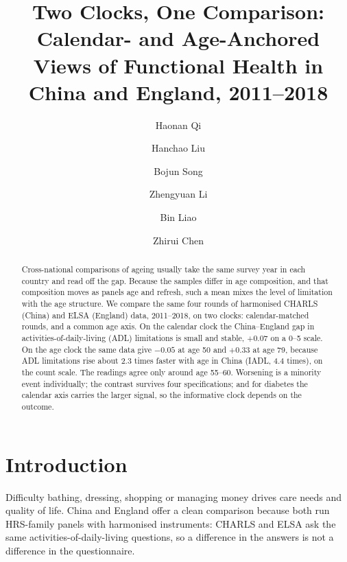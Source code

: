 \documentclass[runningheads]{llncs}
\begin{document}
\title{Two Clocks, One Comparison: Calendar- and Age-Anchored Views of Functional Health in China and England, 2011--2018}

\author{Haonan Qi \and Hanchao Liu \and Bojun Song \and Zhengyuan Li \and Bin Liao \and Zhirui Chen}


\maketitle

\begin{abstract}
Cross-national comparisons of ageing usually take the same survey year in each country and read off the gap. Because the samples differ in age composition, and that composition moves as panels age and refresh, such a mean mixes the level of limitation with the age structure. We compare the same four rounds of harmonised CHARLS (China) and ELSA (England) data, 2011--2018, on two clocks: calendar-matched rounds, and a common age axis. On the calendar clock the China--England gap in activities-of-daily-living (ADL) limitations is small and stable, $+0.07$ on a 0--5 scale. On the age clock the same data give $-0.05$ at age 50 and $+0.33$ at age 79, because ADL limitations rise about 2.3 times faster with age in China (IADL, 4.4 times), on the count scale. The readings agree only around age 55--60. Worsening is a minority event individually; the contrast survives four specifications; and for diabetes the calendar axis carries the larger signal, so the informative clock depends on the outcome.
\end{abstract}

\section{Introduction}

Difficulty bathing, dressing, shopping or managing money drives care needs and quality of life. China and England offer a clean comparison because both run HRS-family panels with harmonised instruments: CHARLS and ELSA ask the same activities-of-daily-living questions, so a difference in the answers is not a difference in the questionnaire.
\end{document}
